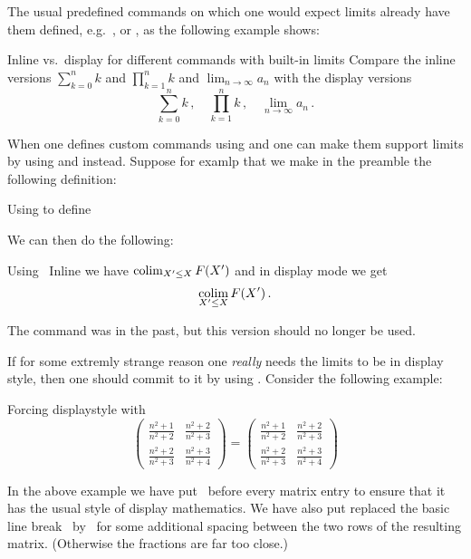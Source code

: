 The usual predefined commands on which one would expect limits already have them defined, e.g.\ ,  or , as the following example shows:
\begin{showlatex}{Inline vs.\ display for different commands with built-in limits}
Compare the inline versions $\sum_{k=0}^n k$ and $\prod_{k=1}^n k$ and $\lim_{n \to \infty} a_n$ with the display versions
\[
  \sum_{k=0}^n k \,,
  \quad
  \prod_{k=1}^n k \,,
  \quad
  \lim_{n \to \infty} a_n \,.
\]
\end{showlatex}
When one defines custom commands using  and  one can make them support limits by using  and  instead.
Suppose for examlp that we make in the preamble the following definition:
\begin{showcode}{Using  to define~}
\DeclareMathOperator*{\colim}{colim}
\end{showcode}
We can then do the following:
\begin{showlatex}{Using~}
Inline we have $\colim_{X' \leq X} F(X')$ and in display mode we get
\[
  \colim_{X' \leq X} F(X') \,.
\]
\end{showlatex}
The command  was  in the past, but this version should no longer be used.

If for some extremly strange reason one \emph{really} needs the limits to be in display style, then one should commit to it by using .
Consider the following example:
\begin{showlatex}{Forcing displaystyle with }
\[
  \begin{pmatrix}
    \frac{n^2+1}{n^2 + 2}
    &
    \frac{n^2+2}{n^2 + 3}
    \\
    \frac{n^2+2}{n^2 + 3}
    &
    \frac{n^2+3}{n^2 + 4}
  \end{pmatrix}
  =
  \begin{pmatrix}
    \displaystyle
    \frac{n^2+1}{n^2 + 2}
    &
    \displaystyle
    \frac{n^2+2}{n^2 + 3}
    \\[1.5em]
    \displaystyle
    \frac{n^2+2}{n^2 + 3}
    &
    \displaystyle
    \frac{n^2+3}{n^2 + 4}
  \end{pmatrix}
\]
\end{showlatex}
In the above example we have put~ before every matrix entry to ensure that it has the usual style of display mathematics.
We have also put replaced the basic line break~\commandname{\tbs} by~\inlinecode{{\tbs}{\tbs}[1.5em]} for some additional spacing between the two rows of the resulting matrix.
(Otherwise the fractions are far too close.)




